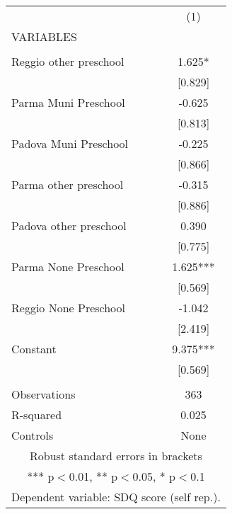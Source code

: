\begin{tabular}{lc} \hline
 & (1) \\
VARIABLES &  \\ \hline
 &  \\
Reggio other preschool & 1.625* \\
 & [0.829] \\
Parma Muni Preschool & -0.625 \\
 & [0.813] \\
Padova Muni Preschool & -0.225 \\
 & [0.866] \\
Parma other preschool & -0.315 \\
 & [0.886] \\
Padova other preschool & 0.390 \\
 & [0.775] \\
Parma None Preschool & 1.625*** \\
 & [0.569] \\
Reggio None Preschool & -1.042 \\
 & [2.419] \\
Constant & 9.375*** \\
 & [0.569] \\
 &  \\
Observations & 363 \\
R-squared & 0.025 \\
 Controls & None \\ \hline
\multicolumn{2}{c}{ Robust standard errors in brackets} \\
\multicolumn{2}{c}{ *** p$<$0.01, ** p$<$0.05, * p$<$0.1} \\
\multicolumn{2}{c}{ Dependent variable: SDQ score (self rep.).} \\
\end{tabular}
